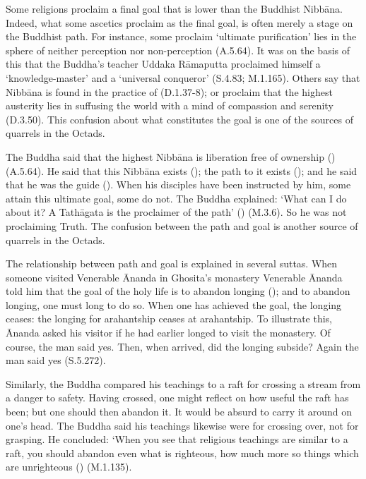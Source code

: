 
Some religions proclaim a final goal that is lower than the Buddhist Nibbāna. Indeed, what some ascetics proclaim as the final goal, is often merely a stage on the Buddhist path. For instance, some proclaim `ultimate purification' lies in the sphere of neither perception nor non-perception (A.5.64). It was on the basis of this that the Buddha's teacher Uddaka Rāmaputta proclaimed himself a `knowledge-master' and a `universal conqueror' (S.4.83; M.1.165). Others say that Nibbāna is found in the practice of  (D.1.37-8); or proclaim that the highest austerity lies in suffusing the world with a mind of compassion and serenity (D.3.50). This confusion about what constitutes the goal is one of the sources of quarrels in the Octads.

The Buddha said that the highest Nibbāna is liberation free of ownership () (A.5.64). He said that this Nibbāna exists (); the path to it exists (); and he said that he was the guide (). When his disciples have been instructed by him, some attain this ultimate goal, some do not. The Buddha explained: `What can I do about it? A Tathāgata is the proclaimer of the path' () (M.3.6). So he was not proclaiming Truth. The confusion between the path and goal is another source of quarrels in the Octads.

The relationship between path and goal is explained in several suttas. When someone visited Venerable Ānanda in Ghosita's monastery Venerable Ānanda told him that the goal of the holy life is to abandon longing (); and to abandon longing, one must long to do so. When one has achieved the goal, the longing ceases: the longing for arahantship ceases at arahantship. To illustrate this, Ānanda asked his visitor if he had earlier longed to visit the monastery. Of course, the man said yes. Then, when arrived, did the longing subside? Again the man said yes (S.5.272).

Similarly, the Buddha compared his teachings to a raft for crossing a stream from a danger to safety. Having crossed, one might reflect on how useful the raft has been; but one should then abandon it. It would be absurd to carry it around on one's head. The Buddha said his teachings likewise were for crossing over, not for grasping. He concluded: `When you see that religious teachings are similar to a raft, you should abandon even what is righteous, how much more so things which are unrighteous () (M.1.135).

